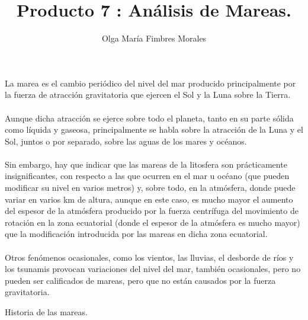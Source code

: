 \documentclass[12pt]{article}
\title{Producto 7 : Análisis de Mareas.}
\author{Olga María Fimbres Morales}
\date{}
\begin{document}
\maketitle



\begin{large}
La marea es el cambio periódico del nivel del mar producido principalmente por la fuerza de atracción gravitatoria que ejercen el Sol y la Luna sobre la Tierra.\\ 
\\Aunque dicha atracción se ejerce sobre todo el planeta, tanto en su parte sólida como líquida y gaseosa, principalmente se habla sobre la atracción de la Luna y el Sol, juntos o por separado, sobre las aguas de los mares y océanos.\\
\\Sin embargo, hay que indicar que las mareas de la litosfera son prácticamente insignificantes, con respecto a las que ocurren en el mar u océano (que pueden modificar su nivel en varios metros) y, sobre todo, en la atmósfera, donde puede variar en varios km de altura, aunque en este caso, es mucho mayor el aumento del espesor de la atmósfera producido por la fuerza centrífuga del movimiento de rotación en la zona ecuatorial (donde el espesor de la atmósfera es mucho mayor) que la modificación introducida por las mareas en dicha zona ecuatorial.
\\
\\Otros fenómenos ocasionales, como los vientos, las lluvias, el desborde de ríos y los tsunamis provocan variaciones del nivel del mar, también ocasionales, pero no pueden ser calificados de mareas, pero que no están causados por la fuerza gravitatoria.\\
\end{large}

\newpage
\begin{center}
\begin{LARGE}
Historia de las mareas.
\end{LARGE}
\end{center}
\end{document}
